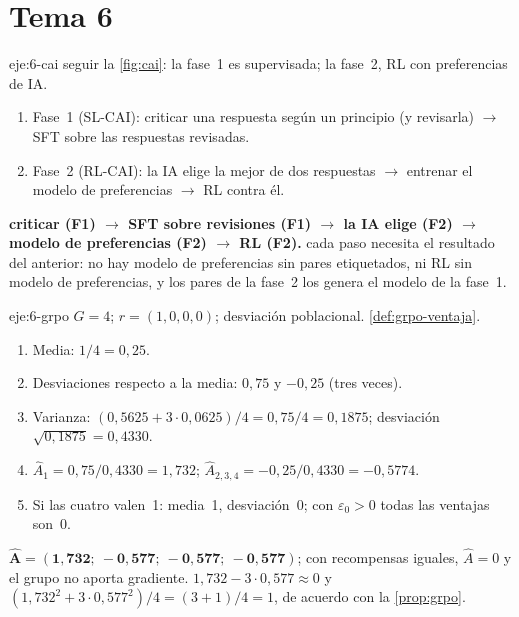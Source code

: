 \section{Tema 6}

\begin{solucion}{eje:6-cai}
\planteamiento seguir la \cref{fig:cai}: la fase~1 es supervisada; la fase~2, RL con preferencias de IA.
\pasos
\begin{enumerate}[label=\arabic*.]
  \item Fase~1 (SL-CAI): criticar una respuesta según un principio (y revisarla) $\to$ SFT sobre las respuestas revisadas.
  \item Fase~2 (RL-CAI): la IA elige la mejor de dos respuestas $\to$ entrenar el modelo de preferencias $\to$ RL contra él.
\end{enumerate}
\resultado \textbf{criticar (F1) $\to$ SFT sobre revisiones (F1) $\to$ la IA elige (F2) $\to$ modelo de preferencias (F2) $\to$ RL (F2).}
\comprobacion cada paso necesita el resultado del anterior: no hay modelo de preferencias sin pares etiquetados, ni RL sin modelo de preferencias, y los pares de la fase~2 los genera el modelo de la fase~1.
\end{solucion}

\begin{solucion}{eje:6-grpo}
\datos $G=4$; $r=(1,0,0,0)$; desviación poblacional.
\planteamiento \cref{def:grpo-ventaja}.
\pasos
\begin{enumerate}[label=\arabic*.]
  \item Media: $1/4=0{,}25$.
  \item Desviaciones respecto a la media: $0{,}75$ y $-0{,}25$ (tres veces).
  \item Varianza: $(0{,}5625+3\cdot 0{,}0625)/4=0{,}75/4=0{,}1875$; desviación $\sqrt{0{,}1875}=0{,}4330$.
  \item $\widehat A_1=0{,}75/0{,}4330=1{,}732$; $\widehat A_{2,3,4}=-0{,}25/0{,}4330=-0{,}5774$.
  \item Si las cuatro valen~1: media~1, desviación~0; con $\varepsilon_0>0$ todas las ventajas son~0.
\end{enumerate}
\resultado $\mathbf{\widehat A=(1{,}732;\ -0{,}577;\ -0{,}577;\ -0{,}577)}$; con recompensas iguales, $\widehat A=0$ y el grupo no aporta gradiente.
\comprobacion $1{,}732-3\cdot 0{,}577\approx 0$ y $(1{,}732^{2}+3\cdot 0{,}577^{2})/4=(3+1)/4=1$, de acuerdo con la \cref{prop:grpo}.
\end{solucion}

